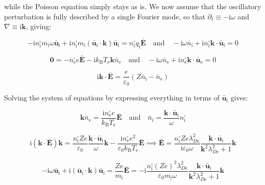 while the Poisson equation simply stays as is. We now assume that the oscillatory perturbation is fully described by a single Fourier mode, so that $\partial_t\equiv-\mathrm{i}\omega$ and $\nabla\equiv\mathrm{i}\mathbf{k}$, giving:

\begin{equation}
    -\mathrm{i}n_\mathrm{i}^\square m_\mathrm{i}\omega\bar{\mathbf{u}}_\mathrm{i}+\mathrm{i}n_\mathrm{i}^\square m_\mathrm{i}(\bar{\mathbf{u}}_\mathrm{i}\cdot\mathbf{k})\bar{\mathbf{u}}_\mathrm{i}=n_\mathrm{i}^\square q_\mathrm{i}\bar{\mathbf{E}}\quad\text{and}\quad-\mathrm{i}\omega\bar{n}_\mathrm{i}+\mathrm{i}n_\mathrm{i}^\square\mathbf{k}\cdot\bar{\mathbf{u}}_\mathrm{i}=0
\end{equation}

\begin{equation}
    \mathbf{0}=-n_\text{e}^\square e\bar{\mathbf{E}}-\mathrm{i}k_\mathrm{B}T_\text{e}\mathbf{k}\bar{n}_\text{e}\quad\text{and}\quad-\mathrm{i}\omega\bar{n}_\text{e}+\mathrm{i}n_\text{e}^\square\mathbf{k}\cdot\bar{\mathbf{u}}_\text{e}=0
\end{equation}

\begin{equation}
    \mathrm{i}\mathbf{k}\cdot\bar{\mathbf{E}}=\frac{e}{\varepsilon_0}(Z\bar{n}_\mathrm{i}-\bar{n}_\text{e})
\end{equation}

Solving the system of equations by expressing everything in terms of $\bar{\mathbf{u}}_\mathrm{i}$ gives:

\begin{equation}
    \mathbf{k}\bar{n}_\text{e}=\frac{\mathrm{i}n_\text{e}^\square e}{k_\mathrm{B}T_\text{e}}\bar{\mathbf{E}}\quad\text{and}\quad\bar{n}_\mathrm{i}=\frac{\mathbf{k}\cdot\bar{\mathbf{u}}_\mathrm{i}}{\omega}n_\mathrm{i}^\square
\end{equation}

\begin{equation}
    \mathrm{i}(\mathbf{k}\cdot\bar{\mathbf{E}})\mathbf{k}=\frac{n_\mathrm{i}^\square Ze}{\varepsilon_0}\frac{\mathbf{k}\cdot\bar{\mathbf{u}}_\mathrm{i}}{\omega}\mathbf{k}-\frac{\mathrm{i}n_\text{e}^\square e^2}{\varepsilon_0 k_\mathrm{B}T_\text{e}}\bar{\mathbf{E}}\implies\bar{\mathbf{E}}=\frac{n_\mathrm{i}^\square Ze\lambda_{D\text{e}}^2}{\mathrm{i}\varepsilon_0\omega}\frac{\mathbf{k}\cdot\bar{\mathbf{u}}_\mathrm{i}}{\mathbf{k}^2\lambda_{D\text{e}}^2+1}\mathbf{k}
\end{equation}

\begin{equation}
    -\mathrm{i}\omega\bar{\mathbf{u}}_\mathrm{i}+\mathrm{i}(\bar{\mathbf{u}}_\mathrm{i}\cdot\mathbf{k})\bar{\mathbf{u}}_\mathrm{i}=\frac{Ze}{m_\mathrm{i}}\bar{\mathbf{E}}=-\mathrm{i}\frac{n_\mathrm{i}^\square (Ze)^2\lambda_{D\text{e}}^2}{\varepsilon_0m_\mathrm{i}\omega}\frac{\mathbf{k}\cdot\bar{\mathbf{u}}_\mathrm{i}}{\mathbf{k}^2\lambda_{D\text{e}}^2+1}\mathbf{k}
\end{equation}

